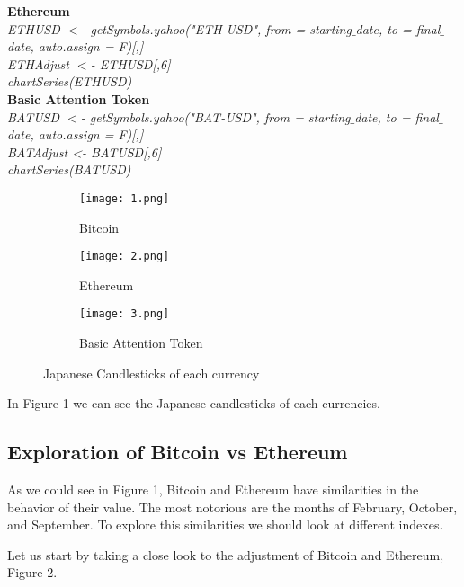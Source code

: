 \documentclass[14pt]{amsart}
\begin{document}
{\bf Ethereum}\\

\noindent \textit{ETHUSD $<$- getSymbols.yahoo("ETH-USD", from = starting$\_$date, to = final$\_$date, auto.assign = F)[,]}\\
\noindent \textit{ETHAdjust $<$- ETHUSD[,6]}\\
\noindent \textit{chartSeries(ETHUSD)}\\


{\bf Basic Attention Token}\\

\noindent \textit{BATUSD $<$- getSymbols.yahoo("BAT-USD", from = starting$\_$date, to = final$\_$date, auto.assign = F)[,]}\\
\noindent \textit{BATAdjust <- BATUSD[,6]}\\
\noindent \textit{chartSeries(BATUSD)}



\begin{figure}[h!]
  \centering
  \begin{subfigure}[b]{0.4\linewidth}
    \texttt{[image: 1.png]}
    \caption{Bitcoin}
  \end{subfigure}
  \begin{subfigure}[b]{0.4\linewidth}
    \texttt{[image: 2.png]}
    \caption{Ethereum}
  \end{subfigure}
    \begin{subfigure}[b]{0.4\linewidth}
    \texttt{[image: 3.png]}
    \caption{Basic Attention Token}
  \end{subfigure}
  \caption{Japanese Candlesticks of each currency}
\end{figure}

In Figure 1 we can see the Japanese candlesticks of each currencies.

\subsection{Exploration of Bitcoin vs Ethereum}

As we could see in Figure 1, Bitcoin and Ethereum have similarities in the behavior of their value. The most notorious are the months of February, October, and September. To explore this similarities we should look at different indexes.

Let us start by taking a close look to the adjustment of Bitcoin and Ethereum, Figure 2.\\
\end{document}
